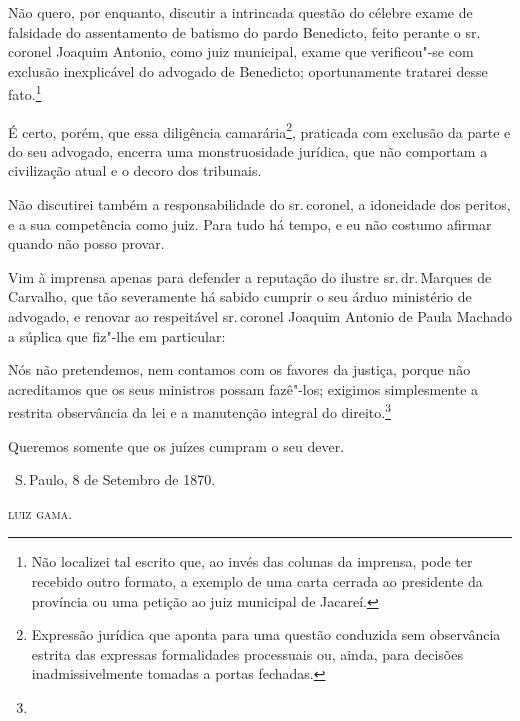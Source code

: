 Não quero, por enquanto, discutir a intrincada questão do célebre exame
de falsidade do assentamento de batismo do pardo Benedicto, feito
perante o sr.\,coronel Joaquim Antonio, como juiz municipal, exame que
verificou"-se com exclusão inexplicável do advogado de Benedicto;
oportunamente tratarei desse fato.\footnote{Não localizei tal escrito
  que, ao invés das colunas da imprensa, pode ter recebido outro
  formato, a exemplo de uma carta cerrada ao presidente da província ou
  uma petição ao juiz municipal de Jacareí.}

É certo, porém, que essa diligência camarária\footnote{Expressão
  jurídica que aponta para uma questão conduzida sem observância estrita
  das expressas formalidades processuais ou, ainda, para decisões
  inadmissivelmente tomadas a portas fechadas.}, praticada com exclusão
da parte e do seu advogado, encerra uma monstruosidade jurídica, que não
comportam a civilização atual e o decoro dos tribunais.

Não discutirei também a responsabilidade do sr.\,coronel, a idoneidade
dos peritos, e a sua competência como juiz. Para tudo há tempo, e eu não
costumo afirmar quando não posso provar.

Vim à imprensa apenas para defender a reputação do ilustre sr.\,dr.\,Marques de Carvalho, que tão severamente há sabido cumprir o seu árduo
ministério de advogado, e renovar ao respeitável sr.\,coronel Joaquim
Antonio de Paula Machado a súplica que fiz"-lhe em particular:

Nós não pretendemos, nem contamos com os favores da justiça, porque não
acreditamos que os seus ministros possam fazê"-los; exigimos simplesmente
a restrita observância da lei e a manutenção integral do
direito.\footnote{}

Queremos somente que os juízes cumpram o seu dever.

\vfill

\hfill\ S.\,Paulo, 8 de Setembro de 1870.\smallskip

\hfill\textsc{luiz gama.}

